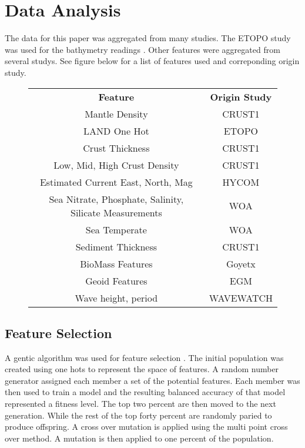 \section{Data Analysis}
The data for this paper was aggregated from many studies.
The ETOPO study was used for the bathymetry readings \cite{national1988etopo}.
Other features were aggregated from several studys.
See figure below for a list of features used and correponding origin study. 

\begin{center}
    \begin{figure}
        \begin{tabular}{ |c|c| }
            \hline
                \textbf{Feature} & \textbf{Origin Study} \\
                Mantle Density & CRUST1 \cite{laske2013update} \\
                LAND One Hot & ETOPO \cite{national1988etopo} \\
                Crust Thickness & CRUST1 \cite{laske2013update} \\
                Low, Mid, High Crust Density & CRUST1 \cite{laske2013update} \\
                Estimated Current East, North, Mag & HYCOM \cite{chassignet2009us} \\
                Sea Nitrate, Phosphate, Salinity, Silicate Measurements & WOA \\
                Sea Temperate & WOA \\
                Sediment Thickness & CRUST1 \cite{laske2013update} \\
                BioMass Features & Goyetx \\
                Geoid Features & EGM \cite{pavlis2008earth} \\
                Wave height, period & WAVEWATCH \cite{tolman20072007}
            \hline
        \end{tabular}
    \end{figure}
\end{center}

\subsection{Feature Selection}
A gentic algorithm was used for feature selection \cite{yang1998feature}.
The initial population was created using one hots to represent the space of features.
A random number generator assigned each member a set of the potential features. 
Each member was then used to train a model and the resulting balanced accuracy of that model represented a fitness level.
The top two percent are then moved to the next generation.
While the rest of the top forty percent are randomly paried to produce offspring.
A cross over mutation is applied using the multi point cross over method.
A mutation is then applied to one percent of the population.

